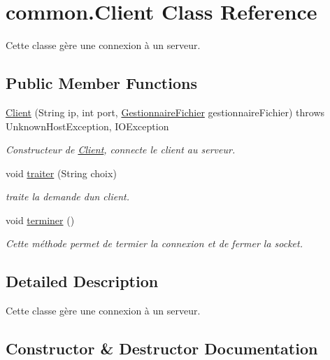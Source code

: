 \hypertarget{classcommon_1_1Client}{}\section{common.\+Client Class Reference}
\label{classcommon_1_1Client}


Cette classe gère une connexion à un serveur.  


\subsection*{Public Member Functions}
\begin{DoxyCompactItemize}
\item 
\hyperlink{classcommon_1_1Client_aee3a57bd9c5b580429fe227490f32de2}{Client} (String ip, int port, \hyperlink{classcommon_1_1GestionnaireFichier}{Gestionnaire\+Fichier} gestionnaire\+Fichier)  throws Unknown\+Host\+Exception, I\+O\+Exception 
\begin{DoxyCompactList}\small\item\em Constructeur de \hyperlink{classcommon_1_1Client}{Client}, connecte le client au serveur. \end{DoxyCompactList}\item 
void \hyperlink{classcommon_1_1Client_aed8cc42e2cceb83b277c5776c8c314ec}{traiter} (String choix)
\begin{DoxyCompactList}\small\item\em traite la demande d\textquotesingle{}un client. \end{DoxyCompactList}\item 
\mbox{\label{classcommon_1_1Client_a1ca2b60d665eaa407e95f22633b58c59}} 
void \hyperlink{classcommon_1_1Client_a1ca2b60d665eaa407e95f22633b58c59}{terminer} ()
\begin{DoxyCompactList}\small\item\em Cette méthode permet de termier la connexion et de fermer la socket. \end{DoxyCompactList}\end{DoxyCompactItemize}


\subsection{Detailed Description}
Cette classe gère une connexion à un serveur. 

\subsection{Constructor \& Destructor Documentation}
\mbox{\label{classcommon_1_1Client_aee3a57bd9c5b580429fe227490f32de2}} 
